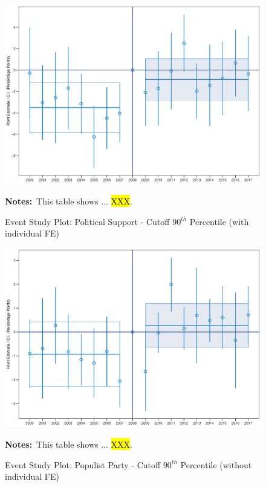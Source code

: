 \documentclass[11pt]{article}
\begin{document}
\begin{figure}[htbp!]
    \centering
    \caption{Event Study Plot: Political Support - Cutoff $90^{th}$ Percentile (with individual FE)}\label{fig:dynamic_did_cbk_past_mean_ps_p90_ife}
    \includegraphics[width=1\linewidth]{events/dynamic_did_cbk_past_mean_ps_p90_ife}
    \begin{tablenotes}
        \footnotesize
        \item \textbf{Notes:}~This table shows ... \hl{XXX}.
    \end{tablenotes} 
\end{figure}

\begin{figure}[htbp!]
    \centering
    \caption{Event Study Plot: Populist Party - Cutoff $90^{th}$ Percentile (without individual FE)}\label{fig:dynamic_did_cbk_past_mean_pp_p90_noife}
    \includegraphics[width=1\linewidth]{events/dynamic_did_cbk_past_mean_pp_p90_noife}
    \begin{tablenotes}
        \footnotesize
        \item \textbf{Notes:}~This table shows ... \hl{XXX}.
    \end{tablenotes} 
\end{figure}
\end{document}
